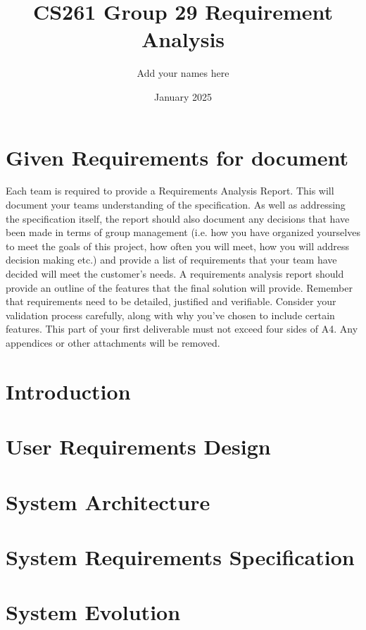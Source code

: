 \documentclass{article}
\title{CS261 Group 29 Requirement Analysis}
\author{Add your names here}
\date{January 2025}
\begin{document}
\maketitle
\tableofcontents

\section{Given Requirements for document}
Each team is required to provide a Requirements Analysis Report. This will document your teams understanding of the specification. As well as addressing the specification itself, the report should also document any decisions that have been made in terms of group management (i.e. how you have organized yourselves to meet the goals of this project, how often you will meet, how you will address decision making etc.) and provide a list of requirements that your team have decided will meet the customer's needs.
A requirements analysis report should provide an outline of the features that the final solution will provide. Remember that requirements need to be detailed, justified and verifiable. Consider your validation process carefully, along with why you've chosen to include certain features.
This part of your first deliverable must not exceed four sides of A4. Any appendices or other attachments will be removed.

\section{Introduction}

\section{User Requirements Design}

\section{System Architecture}

\section{System Requirements Specification}

\section{System Evolution}
\end{document}
